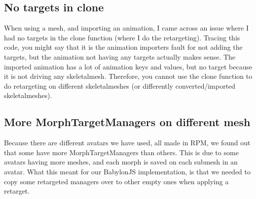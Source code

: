 \documentclass{uva-inf-article}
\begin{document}
\subsection{No targets in clone}
When using a mesh, and importing an animation, I came across an issue where I had no targets in the clone function (where I do the retargeting). Tracing this code, you might say that it is the animation importers fault for not adding the targets, but the animation not having any targets actually makes sense. The imported animation has a lot of animation keys and values, but no target because it is not driving any skeletalmesh. Therefore, you cannot use the clone function to do retargeting on different skeletalmeshes (or differently converted/imported skeletalmeshes).

\subsection{More MorphTargetManagers on different mesh}
Because there are different avatars we have used, all made in RPM, we found out that some have more MorphTargetManagers than others. This is due to some avatars having more meshes, and each morph is saved on each submesh in an avatar. What this meant for our BabylonJS implementation, is that we needed to copy some retargeted managers over to other empty ones when applying a retarget.

\printbibliography



\end{document}
